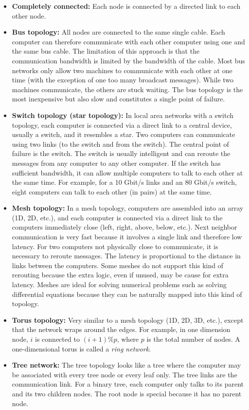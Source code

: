 \documentclass[justified, sixbynine]{tufte-book}
\theoremstyle{plain}%
\newtheorem * {corollary}{Corollary}
\theoremstyle{definition}
\theoremstyle{remark}
\newtheorem * {remark}{Remark}
\newtheorem * {note}{Note}
\begin{document}
\begin{fullwidth}
\begin{itemize}
\item {\bf Completely connected:}
Each node is connected by a directed link to each other node.
\item {\bf Bus topology:}
All nodes are connected to the same single cable. Each computer can therefore communicate with each other computer using one and the same bus cable. The limitation of this approach is that the communication bandwidth is limited by the bandwidth of the cable. Most bus networks only allow two machines to communicate with each other at one time (with the exception of one too many broadcast messages). While two machines communicate, the others are stuck waiting.
The bus topology is the most inexpensive but also slow and constitutes a single point of failure.
\item {\bf Switch topology (star topology):}
In local area networks with a switch topology, each computer is connected via a direct link to a central device, usually a switch, and it resembles a star. Two computers can communicate using two links (to the switch and from the switch). The central point of failure is the switch. The switch is usually intelligent and can reroute the messages from any computer to any other computer. If the switch has sufficient bandwidth, it can allow multiple computers to talk to each other at the same time. For example, for a 10 Gbit/s links and an 80 Gbit/s switch, eight computers can talk to each other (in pairs) at the same time.
\item {\bf Mesh topology:}
In a mesh topology, computers are assembled into an array (1D, 2D, etc.), and each computer is connected via a direct link to the computers immediately close (left, right, above, below, etc.). Next neighbor communication is very fast because it involves a single link and therefore low latency. For two computers not physically close to communicate, it is necessary to reroute messages. The latency is proportional to the distance in links between the computers. Some meshes do not support this kind of rerouting because the extra logic, even if unused, may be cause for extra latency. Meshes are ideal for solving numerical problems such as solving differential equations because they can be naturally mapped into this kind of topology.
\item {\bf Torus topology:}
Very similar to a mesh topology (1D, 2D, 3D, etc.), except that the network wraps around the edges. For example, in one dimension node, $i$ is connected to $(i+1) \% p$, where $p$ is the total number of nodes. A one-dimensional torus is called a {\it ring network}.
\item {\bf Tree network:}
The tree topology looks like a tree where the computer may be associated with every tree node or every leaf only. The tree links are the communication link. For a binary tree, each computer only talks to its parent and its two children nodes. The root node is special because it has no parent node.


\end{itemize}
\end{fullwidth}
\end{document}
